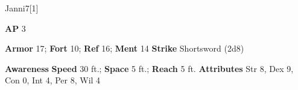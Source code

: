 \begin{monsection}{Janni}{7}[1]
\vspace{-1em}\vspace{-1em}
\begin{spellcontent}
\begin{spelltargetinginfo}
{\textbf{AP} 3}

\pari \textbf{Armor} 17;
\textbf{Fort} 10;
\textbf{Ref} 16;
\textbf{Ment} 14
\pari \textbf{Strike} Shortsword  (2d8)



\end{spelltargetinginfo}


\end{spellcontent}

\begin{monsterfooter}
\pari \textbf{Awareness} 
\pari \textbf{Speed} 30 ft.;
\textbf{Space} 5 ft.;
\textbf{Reach} 5 ft.
\pari \textbf{Attributes}
Str 8,
Dex 9,
Con 0,
Int 4,
Per 8,
Wil 4
\end{monsterfooter}
\end{monsection}



